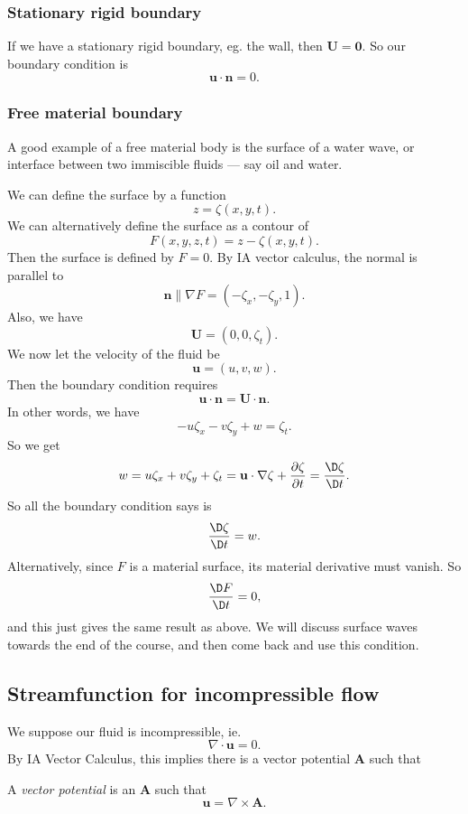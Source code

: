 \documentclass[a4paper]{article}
\begin{document}
\subsubsection{Stationary rigid boundary}
If we have a stationary rigid boundary, eg. the wall, then $\mathbf{U} = \mathbf{0}$. So our boundary condition is
\[
  \mathbf{u}\cdot \mathbf{n}= 0.
\]
\subsubsection{Free material boundary}
A good example of a free material body is the surface of a water wave, or interface between two immiscible fluids --- say oil and water.
\begin{center}
\end{center}
We can define the surface by a function
\[
  z = \zeta(x, y, t).
\]
We can alternatively define the surface as a contour of
\[
  F(x, y, z, t) = z - \zeta(x, y, t).
\]
Then the surface is defined by $F = 0$. By IA vector calculus, the normal is parallel to
\[
  \mathbf{n} \parallel \nabla F = (-\zeta_x, -\zeta_y, 1).
\]
Also, we have
\[
  \mathbf{U} = (0, 0, \zeta_t).
\]
We now let the velocity of the fluid be
\[
  \mathbf{u} = (u, v, w).
\]
Then the boundary condition requires
\[
  \mathbf{u}\cdot \mathbf{n} = \mathbf{U}\cdot \mathbf{n}.
\]
In other words, we have
\[
  -u \zeta_x - v\zeta_y + w = \zeta_t.
\]
So we get
\[
  w = u \zeta_x + v\zeta_y + \zeta_t = \mathbf{u}\cdot \nabla \zeta + \frac{\partial \zeta}{\partial t} = \frac{\D \zeta}{\D t}.
\]
So all the boundary condition says is
\[
  \frac{\D \zeta}{\D t} = w.
\]
Alternatively, since $F$ is a material surface, its material derivative must vanish. So
\[
  \frac{\D F}{\D t} = 0,
\]
and this just gives the same result as above. We will discuss surface waves towards the end of the course, and then come back and use this condition.

\subsection{Streamfunction for incompressible flow}
We suppose our fluid is incompressible, ie.
\[
  \nabla \cdot \mathbf{u} = 0.
\]
By IA Vector Calculus, this implies there is a vector potential $\mathbf{A}$ such that
\begin{defi}
  A \emph{vector potential} is an $\mathbf{A}$ such that
  \[
    \mathbf{u} = \nabla \times \mathbf{A}.
  \]
\end{defi}
\end{document}
